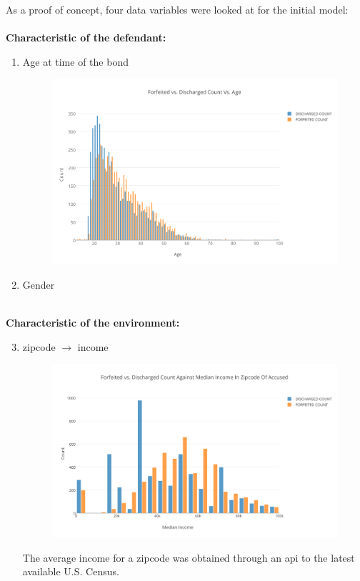 \documentclass{article}
\begin{document}
As a proof of concept, four data variables were looked at for the initial model: \\
~\\
\textbf{Characteristic of the defendant:}
~\\
\begin{enumerate}
\item Age at time of the bond
\begin{figure}[H]
\centering
\includegraphics[width=0.5\paperwidth]{Forfeited_vs_Discharged_Count_Vs_Age.png}
\end{figure}

\item Gender
\end{enumerate}
~\\
\textbf{Characteristic of the environment:}
~\\
\begin{enumerate}
\setcounter{enumi}{2}
\item zipcode $\rightarrow$ income
\begin{figure}[H]
\centering
\includegraphics[width=0.5\paperwidth]{Forfeited_vs_Discharged_Count_Against_Median_Income_In_Zipcode_Of_Accused.png}
\end{figure}

The average income for a zipcode was obtained through an api to the latest available U.S. Census.   
\end{enumerate}
\end{document}
